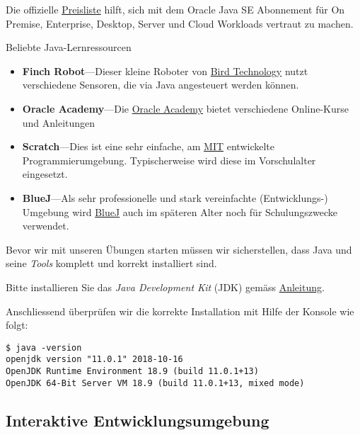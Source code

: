 Die offizielle \href{https://www.oracle.com/corporate/pricing/#java-se}
{Preisliste} hilft, sich mit dem Oracle Java SE Abonnement für On Premise, 
Enterprise, Desktop, Server und Cloud Workloads vertraut zu machen.


\begin{frame}{Beliebte Java-Lernressourcen}
	\begin{itemize}
		\item\textbf{Finch Robot}---Dieser kleine Roboter von 
		\href{https://www.birdbraintechnologies.com/finch/}
		{Bird Technology} nutzt verschiedene Sensoren,
		die via Java angesteuert werden können.
		\item\textbf{Oracle Academy}---Die 
		\href{https://academy.oracle.com/en/training-self-study.html}
		{Oracle Academy} bietet verschiedene 
		Online-Kurse und Anleitungen
		\item\textbf{Scratch}---Dies ist eine sehr einfache, am
		\href{https://scratch.mit.edu/}{MIT} entwickelte Programmierumgebung.
		Typischerweise wird diese im Vorschulalter eingesetzt. 
		\item\textbf{BlueJ}---Als sehr professionelle und stark vereinfachte
		(Entwicklungs-) Umgebung wird \href{http://www.bluej.org/}{BlueJ} 
		auch im späteren Alter noch für Schulungszwecke verwendet.
	\end{itemize}
\end{frame}
	
\begin{Exercise}[%
	title={Installation der Software},
	label={ex:installation}]
	
	Bevor wir mit unseren Übungen starten müssen wir sicherstellen, dass Java und
	seine {\em Tools} komplett und korrekt installiert sind.
	
	Bitte installieren Sie das {\em Java Development Kit} (JDK) gemäss 
	\href{https://jdk.java.net/11/}{Anleitung}.
	
	Anschliessend überprüfen wir die korrekte Installation mit Hilfe der Konsole wie folgt:
	
	\begin{verbatim}
$ java -version
openjdk version "11.0.1" 2018-10-16
OpenJDK Runtime Environment 18.9 (build 11.0.1+13)
OpenJDK 64-Bit Server VM 18.9 (build 11.0.1+13, mixed mode)
	\end{verbatim}
	
\end{Exercise}	

\subsection{Interaktive Entwicklungsumgebung}

